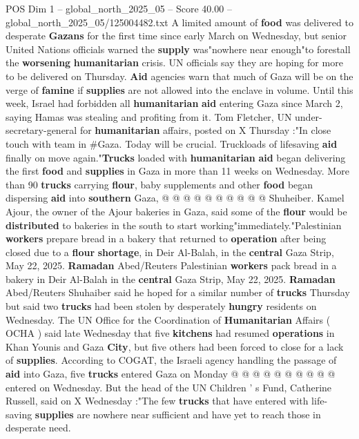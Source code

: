 \begin{textsample}{POS Dim 1 – global\_north\_2025\_05 – Score 40.00 – global\_north\_2025\_05/125004482.txt}  \label{ex:f1_pos_211}
A limited amount of \textbf{food} was delivered to desperate \textbf{Gazans} for the first time since early March on Wednesday, but senior United Nations officials warned the \textbf{supply} was"nowhere near enough"to forestall the \textbf{worsening} \textbf{humanitarian} crisis.
UN officials say they are hoping for more to be delivered on Thursday. \textbf{Aid} agencies warn that much of Gaza will be on the verge of \textbf{famine} if \textbf{supplies} are not allowed into the enclave in volume.
Until this week, Israel had forbidden all \textbf{humanitarian} \textbf{aid} entering Gaza since March 2, saying Hamas was stealing and profiting from it.
Tom Fletcher, UN under-secretary-general for \textbf{humanitarian} affairs, posted on X Thursday :"In close touch with team in \#Gaza.
Today will be crucial.
Truckloads of lifesaving \textbf{aid} finally on move again."\textbf{Trucks} loaded with \textbf{humanitarian} \textbf{aid} began delivering the first \textbf{food} and \textbf{supplies} in Gaza in more than 11 weeks on Wednesday.
More than 90 \textbf{trucks} carrying \textbf{flour}, baby supplements and other \textbf{food} began dispersing \textbf{aid} into \textbf{southern} Gaza, @ @ @ @ @ @ @ @ @ @ Shuheiber.
Kamel Ajour, the owner of the Ajour bakeries in Gaza, said some of the \textbf{flour} would be \textbf{distributed} to bakeries in the south to start working"immediately."Palestinian \textbf{workers} prepare bread in a bakery that returned to \textbf{operation} after being closed due to a \textbf{flour} \textbf{shortage}, in Deir Al-Balah, in the \textbf{central} Gaza Strip, May 22, 2025. \textbf{Ramadan} Abed/Reuters Palestinian \textbf{workers} pack bread in a bakery in Deir Al-Balah in the \textbf{central} Gaza Strip, May 22, 2025. \textbf{Ramadan} Abed/Reuters Shuhaiber said he hoped for a similar number of \textbf{trucks} Thursday but said two \textbf{trucks} had been stolen by desperately \textbf{hungry} residents on Wednesday.
The UN Office for the Coordination of \textbf{Humanitarian} Affairs ( OCHA ) said late Wednesday that five \textbf{kitchens} had resumed \textbf{operations} in Khan Younis and Gaza \textbf{City}, but five others had been forced to close for a lack of \textbf{supplies}.
According to COGAT, the Israeli agency handling the passage of \textbf{aid} into Gaza, five \textbf{trucks} entered Gaza on Monday @ @ @ @ @ @ @ @ @ @ entered on Wednesday.
But the head of the UN Children ' s Fund, Catherine Russell, said on X Wednesday :"The few \textbf{trucks} that have entered with life-saving \textbf{supplies} are nowhere near sufficient and have yet to reach those in desperate need.

\end{textsample}
